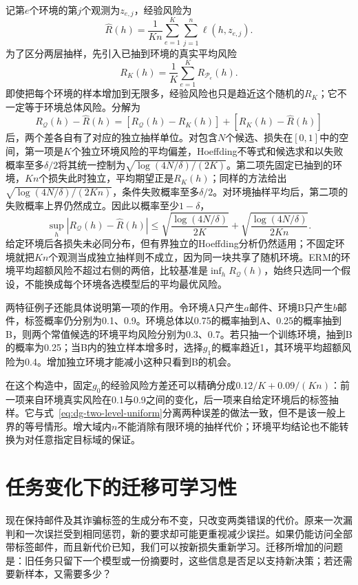 记第$e$个环境的第$j$个观测为$z_{e,j}$，经验风险为
\[
 \widehat R(h)=\frac1{Kn}\sum_{e=1}^K\sum_{j=1}^n\ell(h,z_{e,j}).
\]
为了区分两层抽样，先引入已抽到环境的真实平均风险
\[
 R_K(h)=\frac1K\sum_{e=1}^K R_{\mathcal P_e}(h).
\]
即使把每个环境的样本增加到无限多，经验风险也只是趋近这个随机的$R_K$；它不一定等于环境总体风险。分解为
\[
 R_{\mathcal Q}(h)-\widehat R(h)
 =[R_{\mathcal Q}(h)-R_K(h)]+[R_K(h)-\widehat R(h)]
\]
后，两个差各自有了对应的独立抽样单位。对包含$N$个候选、损失在$[0,1]$中的空间，第一项是$K$个独立环境风险的平均偏差，Hoeffding不等式和候选求和以失败概率至多$\delta/2$将其统一控制为$\sqrt{\log(4N/\delta)/(2K)}$。第二项先固定已抽到的环境，$Kn$个损失此时独立，平均期望正是$R_K(h)$；同样的方法给出$\sqrt{\log(4N/\delta)/(2Kn)}$，条件失败概率至多$\delta/2$。对环境抽样平均后，第二项的失败概率上界仍然成立。因此以概率至少$1-\delta$，
\begin{equation}
 \sup_h|R_{\mathcal Q}(h)-\widehat R(h)|
 \leq\sqrt{\frac{\log(4N/\delta)}{2K}}
     +\sqrt{\frac{\log(4N/\delta)}{2Kn}}.
 \label{eq:dg-two-level-uniform}
\end{equation}
给定环境后各损失未必同分布，但有界独立的Hoeffding分析仍然适用；不固定环境就把$Kn$个观测当成独立抽样则不成立，因为同一块共享了随机环境。ERM的环境平均超额风险不超过右侧的两倍，比较基准是$\inf_hR_{\mathcal Q}(h)$，始终只选同一个假设，不能换成每个环境各选模型后的平均最优风险。

两特征例子还能具体说明第一项的作用。令环境A只产生$a$邮件、环境B只产生$b$邮件，标签概率仍分别为0.1、0.9。环境总体以0.75的概率抽到A、0.25的概率抽到B，则两个常值候选的环境平均风险分别为0.3、0.7。若只抽一个训练环境，抽到B的概率为0.25；当B内的独立样本增多时，选择$g_1$的概率趋近1，其环境平均超额风险为0.4。增加独立环境才能减小这种只看到B的机会。

在这个构造中，固定$g_0$的经验风险方差还可以精确分成$0.12/K+0.09/(Kn)$：前一项来自环境真实风险在0.1与0.9之间的变化，后一项来自给定环境后的标签抽样。它与式~\eqref{eq:dg-two-level-uniform}分离两种误差的做法一致，但不是该一般上界的等号情形。增大域内$n$不能消除有限环境的抽样代价；环境平均结论也不能转换为对任意指定目标域的保证。
\section{任务变化下的迁移可学习性}
\label{sec:task-transfer-learnability}

现在保持邮件及其诈骗标签的生成分布不变，只改变两类错误的代价。原来一次漏判和一次误拦受到相同惩罚，新的要求却可能更重视减少误拦。如果仍能访问全部带标签邮件，而且新代价已知，我们可以按新损失重新学习。迁移所增加的问题是：旧任务只留下一个模型或一份摘要时，这些信息是否足以支持新决策；若还需要新样本，又需要多少？

